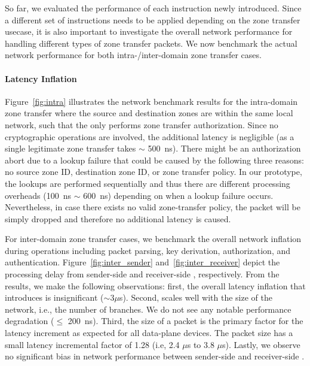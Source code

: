 So far, we evaluated the performance of each instruction newly introduced. Since a different
set of instructions needs to be applied depending on the zone transfer usecase, it is also
important to investigate the overall network performance for handling different types of zone
transfer packets. We now benchmark the actual network performance for both intra-/inter-domain
zone transfer cases.

\paragraph{Latency Inflation}
Figure~\ref{fig:intra} illustrates the network benchmark results for the intra-domain zone
transfer where the source and destination zones are within the same local network, such that
the \tp only performs zone transfer authorization. Since no cryptographic operations are involved,
the additional latency is negligible (as a single legitimate zone transfer takes $\sim$
\SI{500}{ns}). There might be an authorization abort due to a lookup failure that could be
caused by the following three reasons: no source zone ID, destination zone ID, or
zone transfer policy. In our prototype, the lookups are performed sequentially and thus
there are different processing overheads (\SI{100}{ns} $\sim$ \SI{600}{ns}) depending on when a
lookup failure occurs. Nevertheless, in case there exists no valid zone-transfer policy, the
packet will be simply dropped and therefore no additional latency is caused.

For inter-domain zone transfer cases, we benchmark the overall network inflation during \tp
operations including packet parsing, key derivation, authorization, and authentication.
Figure~\ref{fig:inter_sender} and~\ref{fig:inter_receiver} depict the processing delay from
sender-side \tp and receiver-side \tp, respectively.
From the results, we make the following observations: first, the overall latency inflation that
\name introduces is insignificant ($\sim 3 \mu$s). Second, \name scales well with the size of the
network, i.e., the number of branches. We do not see any notable performance degradation
($\leq$ \SI{200}{ns}). Third, the size of a packet is the primary factor for the latency increment
as expected for all data-plane devices. The packet size has a small latency incremental factor of
1.28 (i.e, 2.4 $\mu$s to 3.8 $\mu$s). Lastly, we observe no significant bias in network
performance between sender-side and receiver-side \tps.


